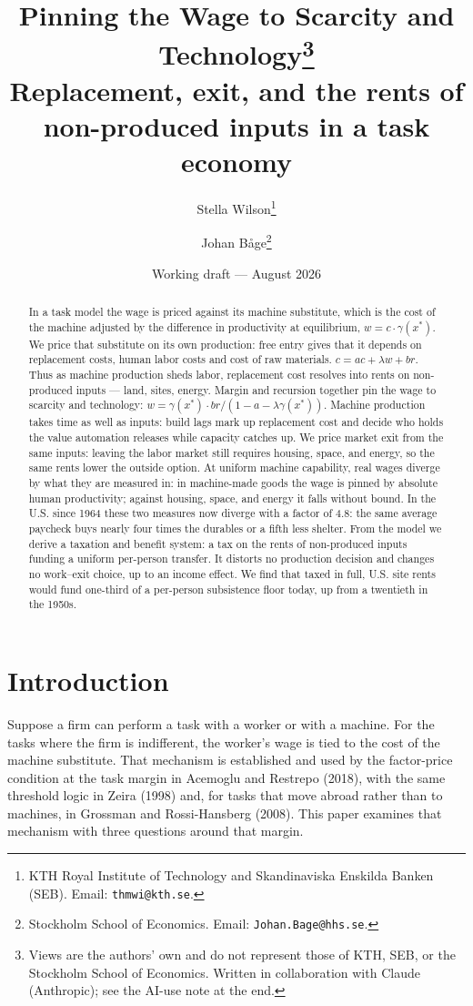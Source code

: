 \documentclass[12pt]{article}
\title{\bfseries Pinning the Wage to Scarcity and Technology\thanks{Views are the
  authors' own and do not represent those of KTH, SEB, or the Stockholm School of
  Economics. Written in collaboration with Claude (Anthropic); see the AI-use note
  at the end.
  }\\[7pt]
  \large\mdseries Replacement, exit, and the rents of non-produced inputs in a task economy}
\author{Stella Wilson\thanks{KTH Royal Institute of Technology and Skandinaviska
    Enskilda Banken (SEB). Email: \texttt{thmwi@kth.se}.}
  \and
  Johan B\r{a}ge\thanks{Stockholm School of Economics.
    Email: \texttt{Johan.Bage@hhs.se}.
  }}
\date{Working draft --- August 2026}
\theoremstyle{plain}
\begin{document}
\maketitle

\begin{abstract}
\noindent In a task model the wage is priced against its machine substitute, which is the cost of the machine adjusted by the difference in productivity at equilibrium, $w = c\cdot \gamma (x^*)$. We price that substitute on its own production: free entry gives that it depends on replacement costs, human labor costs and cost of raw materials. $c = ac + \lambda w + br$. Thus as machine production sheds labor, replacement cost resolves into rents on non-produced inputs --- land, sites, energy. Margin and recursion together pin the wage to scarcity and technology: $w = \gamma (x^*)\cdot br/(1 - a - \lambda \gamma (x^*))$. Machine production takes time as well as inputs: build lags mark up replacement cost and decide who holds the value automation releases while capacity catches up. We price market exit from the same inputs: leaving the labor market still requires housing, space, and energy, so the same rents lower the outside option. At uniform machine capability, real wages diverge by what they are measured in: in machine-made goods the wage is pinned by absolute human productivity; against housing, space, and energy it falls without bound. In the U.S. since 1964 these two measures now diverge with a factor of 4.8: the same average paycheck buys nearly four times the durables or a fifth less shelter. From the model we derive a taxation and benefit system: a tax on the rents of non-produced inputs funding a uniform per-person transfer. It distorts no production decision and changes no work--exit choice, up to an income effect. We find that taxed in full, U.S. site rents would fund one-third of a per-person subsistence floor today, up from a twentieth in the 1950s.
\end{abstract}

\section{Introduction}\label{sec:intro}

Suppose a firm can perform a task with a worker or with a machine. For the tasks where the firm is indifferent, the worker's wage is tied to the cost of the machine substitute. That mechanism is established and used by the factor-price condition at the task margin in Acemoglu and Restrepo (2018), with the same threshold logic in Zeira (1998) and, for tasks that move abroad rather than to machines, in Grossman and Rossi-Hansberg (2008). This paper examines that mechanism with three questions around that margin.
\end{document}
